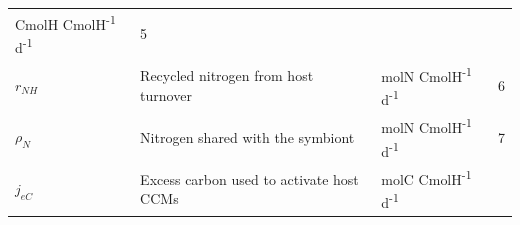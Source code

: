 \documentclass[]{elsarticle} %
\begin{document}
\begin{longtable}[c]{@{}llll@{}}
\begin{minipage}[t]{0.25\columnwidth}\raggedright\strut
CmolH CmolH\textsuperscript{-1} d\textsuperscript{-1}
\strut\end{minipage} &
\begin{minipage}[t]{0.10\columnwidth}\raggedright\strut
5
\strut\end{minipage}\tabularnewline
\begin{minipage}[t]{0.10\columnwidth}\raggedright\strut
\(r_{NH}\)
\strut\end{minipage} &
\begin{minipage}[t]{0.48\columnwidth}\raggedright\strut
Recycled nitrogen from host turnover
\strut\end{minipage} &
\begin{minipage}[t]{0.25\columnwidth}\raggedright\strut
molN CmolH\textsuperscript{-1} d\textsuperscript{-1}
\strut\end{minipage} &
\begin{minipage}[t]{0.10\columnwidth}\raggedright\strut
6
\strut\end{minipage}\tabularnewline
\begin{minipage}[t]{0.10\columnwidth}\raggedright\strut
\(\rho_N\)
\strut\end{minipage} &
\begin{minipage}[t]{0.48\columnwidth}\raggedright\strut
Nitrogen shared with the symbiont
\strut\end{minipage} &
\begin{minipage}[t]{0.25\columnwidth}\raggedright\strut
molN CmolH\textsuperscript{-1} d\textsuperscript{-1}
\strut\end{minipage} &
\begin{minipage}[t]{0.10\columnwidth}\raggedright\strut
7
\strut\end{minipage}\tabularnewline
\begin{minipage}[t]{0.10\columnwidth}\raggedright\strut
\(j_{eC}\)
\strut\end{minipage} &
\begin{minipage}[t]{0.48\columnwidth}\raggedright\strut
Excess carbon used to activate host CCMs
\strut\end{minipage} &
\begin{minipage}[t]{0.25\columnwidth}\raggedright\strut
molC CmolH\textsuperscript{-1} d\textsuperscript{-1}
\strut\end{minipage} &
\begin{minipage}[t]{0.10\columnwidth}\raggedright\strut
\strut\end{minipage}\tabularnewline

\end{longtable}
\end{document}

